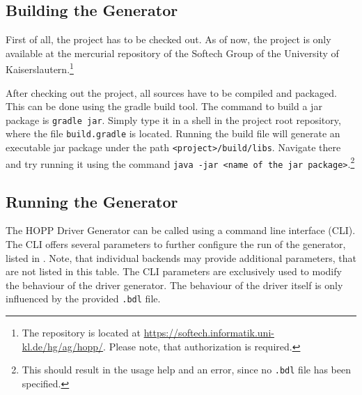 \documentclass{report}
\begin{document}
%
%
%
%
%
%
%

\subsection{Building the Generator}
First of all, the project has to be checked out. As of now, the project is only available at the mercurial repository of the Softech Group of the University of Kaiserslautern.\footnote{The repository is located at \url{https://softech.informatik.uni-kl.de/hg/ag/hopp/}. Please note, that authorization is required.}

After checking out the project, all sources have to be compiled and packaged. This can be done using the gradle build tool. The command to build a jar package is \texttt{gradle jar}. Simply type it in a shell in the project root repository, where the file \texttt{build.gradle} is located. Running the build file will generate an executable jar package under the path \texttt{<project>/build/libs}. Navigate there and try running it using the command \texttt{java -jar <name of the jar package>}.\footnote{This should result in the usage help and an error, since no \texttt{.bdl} file has been specified.}

\subsection{Running the Generator}
The HOPP Driver Generator can be called using a command line interface (CLI). The CLI offers several parameters to further configure the run of the generator, listed in . Note, that individual backends may provide additional parameters, that are not listed in this table. The CLI parameters are exclusively used to modify the behaviour of the driver generator. The behaviour of the driver itself is only influenced by the provided \texttt{.bdl} file.
\end{document}

